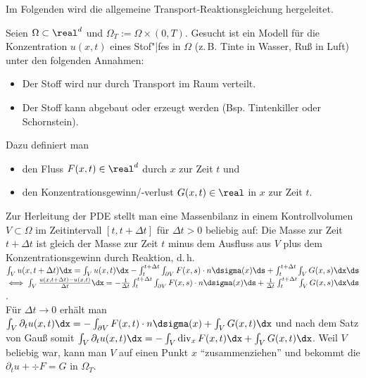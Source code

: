 \begin{Bem}
    Im Folgenden wird die allgemeine Transport-Reaktionsgleichung hergeleitet.

    Seien $\Omega \subset \real^d$ und $\Omega_T := \Omega \times (0, T)$.
    Gesucht ist ein Modell für die Konzentration $u(x, t)$ eines Stof"|fes in $\Omega$
    (z.\,B. Tinte in Wasser, Ruß in Luft) unter den folgenden Annahmen:
    \begin{itemize}
        \item
        Der Stoff wird nur durch Transport im Raum verteilt.

        \item
        Der Stoff kann abgebaut oder erzeugt werden
        (Bsp. Tintenkiller oder Schornstein).
    \end{itemize}
    Dazu definiert man
    \begin{itemize}
        \item
        den Fluss $F(x, t) \in \real^d$ durch $x$ zur Zeit $t$ und

        \item
        den Konzentrationsgewinn/-verlust $G(x, t) \in \real$ in $x$ zur Zeit $t$.
    \end{itemize}
    Zur Herleitung der PDE stellt man eine Massenbilanz in einem Kontrollvolumen $V \subset \Omega$
    im Zeitintervall $[t, t + \Delta t]$ für $\Delta t > 0$ beliebig auf:
    Die Masse zur Zeit $t + \Delta t$ ist gleich der Masse zur Zeit $t$ minus dem Ausfluss aus $V$
    plus dem Konzentrationsgewinn durch Reaktion, d.\,h.
    $\int_V u(x, t + \Delta t) \dx = \int_V u(x, t) \dx -
    \int_t^{t + \Delta t} \int_{\partial V} F(x,s) \cdot n\dsigma(x) \ds +
    \int_t^{t + \Delta t} \int_V G(x, s) \dx \ds$\\
    $\iff \int_V \frac{u(x, t + \Delta t) - u(x, t)}{\Delta t} \dx =
    -\frac{1}{\Delta t} \int_t^{t + \Delta t} \int_{\partial V} F(x,s) \cdot n\dsigma(x) \ds +
    \frac{1}{\Delta t} \int_t^{t + \Delta t} \int_V G(x, s) \dx \ds$.\\
    Für $\Delta t \to 0$ erhält man
    $\int_V \partial_t u(x, t) \dx = -\int_{\partial V} F(x, t) \cdot n \dsigma(x) +
    \int_V G(x, t) \dx$ und nach dem Satz von Gauß somit
    $\int_V \partial_t u(x, t) \dx = -\int_V \div_x F(x, t) \dx + \int_V G(x, t) \dx$.
    Weil $V$ beliebig war, kann man $V$ auf einen Punkt $x$ "`zusammenziehen"' und bekommt die\\
    $\partial_t u + \div F = G$ in $\Omega_T$.
\end{Bem}

